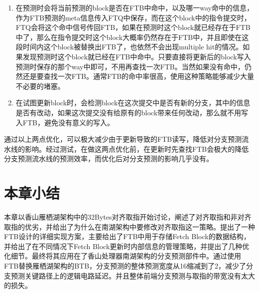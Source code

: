 \begin{enumerate}
	\item 在预测时会将当前预测的block是否在FTB中命中，以及哪一way命中的信息，作为FTB预测的meta信息传入FTQ中保存，而在这个block中的指令提交时，FTQ会将这个命中信号传回FTB，如果在预测时这个block就已经存在于FTB中了，那么在指令提交时这个block大概率仍然存在于FTB中，并且即使在这段时间内这个block被替换出FTB了，也依然不会出现multiple hit的情况。如果发现预测时这个block就已经在FTB中命中。只要直接将更新后的block写入预测时保存的那个way中即可，不用再查找一次FTB。当然如果没有命中，仍然还是要查找一次FTB。通常FTB的命中率很高，使用这种策略能够减少大量不必要的堵塞。
	\item 在试图更新block时，会检测block在这次提交中是否有新的分支，其中的信息是否有改动，如果这次提交没有给原有的block带来任何改动，那么就不用写入FTB，避免没有意义的写入。
\end{enumerate}

通过以上两点优化，可以极大减少由于更新导致的FTB读写，降低对分支预测流水线的影响。经过测试，在做这两点优化前，在更新时先查找FTB会极大的降低分支预测流水线的预测效率，而优化后对分支预测的影响几乎没有。


\section{本章小结}

本章以香山雁栖湖架构中的32Bytes对齐取指开始讨论，阐述了对齐取指和非对齐取指的优劣，并给出了为什么在南湖架构中要修改对齐取指这一策略。提出了一种FTB设计的详细实现方案，主要给出了FTB中用于存储Fetch Block的数据结构，并给出了在不同情况下Fetch Block更新时内部信息的管理策略，并提出了几种优化细节。最终将其应用在了香山处理器南湖架构的分支预测部件中。通过使用FTB替换雁栖湖架构的BTB，分支预测的整体预测宽度从16缩减到了2，减少了分支预测关键路径上的逻辑电路延迟。并且整体前端分支预测与取指的带宽没有太大的损失。

